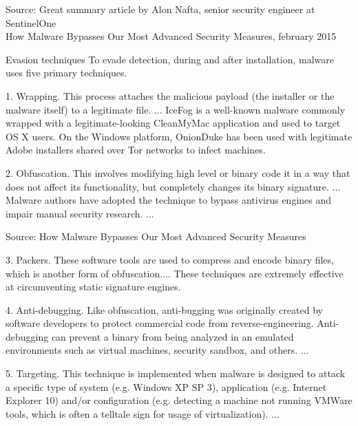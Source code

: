 \documentclass[20pt,landscape,a4paper]{foils}
\begin{document}
{\small Source: Great summary article by Alon Nafta, senior security engineer at SentinelOne\\
How Malware Bypasses Our Most Advanced Security Measures, february 2015}\\
{\tiny{}}




Evasion techniques
To evade detection, during and after installation, malware uses five primary techniques.
\begin{list1}
\item 1. Wrapping. This process attaches the malicious payload (the installer or the malware itself) to a legitimate file.
... IceFog is a well-known malware commonly wrapped with a legitimate-looking CleanMyMac application and used to target OS X users. On the Windows platform, OnionDuke has been used with legitimate Adobe installers shared over Tor networks to infect machines.
\item 2. Obfuscation. This involves modifying high level or binary code it in a way that does not affect its functionality, but completely changes its binary signature. ... Malware authors have adopted the technique to bypass antivirus engines and impair manual security research. ...
\end{list1}

Source: How Malware Bypasses Our Most Advanced Security Measures\\
{\tiny{}}


\begin{list1}
\item 3. Packers. These software tools are used to compress and encode binary files, which is another form of obfuscation.... These techniques are extremely effective at circumventing static signature engines.
\item 4. Anti-debugging. Like obfuscation, anti-bugging was originally created by software developers to protect commercial code from reverse-engineering. Anti-debugging can prevent a binary from being analyzed in an emulated environments such as virtual machines, security sandbox, and others. ...
\item 5.  Targeting. This technique is implemented when malware is designed to attack a specific type of system (e.g. Windows XP SP 3), application (e.g. Internet Explorer 10) and/or configuration (e.g. detecting a machine not running VMWare tools, which is often a telltale sign for usage of virtualization). ...
\end{list1}
\end{document}
